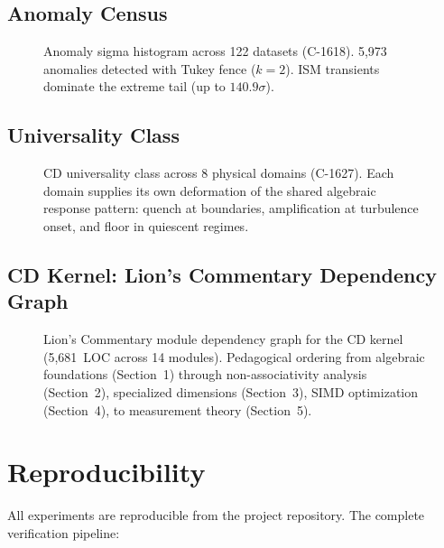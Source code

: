 \documentclass[12pt,openany]{report}
\theoremstyle{definition}
\theoremstyle{plain}
\theoremstyle{remark}
\begin{document}
\section{Anomaly Census}

\begin{figure}[htbp]
\centering
\resizebox{\textwidth}{!}{}
\caption{Anomaly sigma histogram across 122 datasets (C-1618).
5{,}973 anomalies detected with Tukey fence ($k = 2$).  ISM transients
dominate the extreme tail (up to $140.9\sigma$).}
\label{fig:anomaly-histogram}
\end{figure}

\section{Universality Class}

\begin{figure}[htbp]
\centering
\resizebox{0.85\textwidth}{!}{}
\caption{CD universality class across 8 physical domains (C-1627).
Each domain supplies its own deformation of the shared algebraic
response pattern: quench at boundaries, amplification at turbulence
onset, and floor in quiescent regimes.}
\label{fig:universality}
\end{figure}

\section{CD Kernel: Lion's Commentary Dependency Graph}

\begin{figure}[htbp]
\centering
\resizebox{0.7\textwidth}{!}{}
\caption{Lion's Commentary module dependency graph for the CD kernel
(5{,}681~LOC across 14 modules).  Pedagogical ordering from algebraic
foundations (Section~1) through non-associativity analysis (Section~2),
specialized dimensions (Section~3), SIMD optimization (Section~4),
to measurement theory (Section~5).}
\label{fig:lions-dag}
\end{figure}


\chapter{Reproducibility}
\label{ch:reproducibility}

All experiments are reproducible from the project repository.  The
complete verification pipeline:
\end{document}
